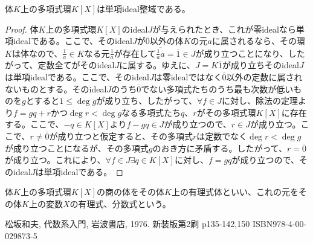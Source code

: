 \documentclass[dvipdfmx]{jsarticle}
\begin{document}
\begin{thm}\label{3.3.3.13}
体$K$上の多項式環$K[ X]$は単項ideal整域である。
\end{thm}
\begin{proof}
体$K$上の多項式環$K[ X]$のideal$J$が与えられたとき、これが零idealなら単項idealである。ここで、そのideal$J$が$\overline{0}$以外の体$K$の元$a$に属されるなら、その環$K$は体なので、$\frac{1}{a} \in K$なる元$\frac{1}{a}$が存在して$\overline{\frac{1}{a}a} = \overline{1} \in J$が成り立つことになり、したがって、定数全てがそのideal$J$に属する。ゆえに、$J = K\overline{1}$が成り立ちそのideal$J$は単項idealである。ここで、そのideal$J$は零idealではなく$\overline{0}$以外の定数に属されないものとする。そのideal$J$のうち$\overline{0}$でない多項式たちのうち最も次数が低いものを$g$とすると$1 \leq \deg g$が成り立ち、したがって、$\forall f \in J$に対し、除法の定理より$f = gq + r$かつ$\deg r < \deg g$なる多項式たち$q$、$r$がその多項式環$K[ X]$に存在する。ここで、$- q \in K[ X]$より$f - gq \in J$が成り立つので、$r \in J$が成り立つ。ここで、$r \neq \overline{0}$が成り立つと仮定すると、その多項式$r$は定数でなく$\deg r < \deg g$が成り立つことになるが、その多項式$g$のおき方に矛盾する。したがって、$r = \overline{0}$が成り立つ。これにより、$\forall f \in J\exists q \in K[ X]$に対し、$f = gq$が成り立つので、そのideal$J$は単項idealである。
\end{proof}
\begin{dfn}
体$K$上の多項式環$K[ X]$の商の体をその体$K$上の有理式体といい、これの元をその体$K$上の変数$X$の有理式、分数式という。
\end{dfn}
\begin{thebibliography}{50}
  松坂和夫, 代数系入門, 岩波書店, 1976. 新装版第2刷 p135-142,150 ISBN978-4-00-029873-5
\end{thebibliography}
\end{document}
